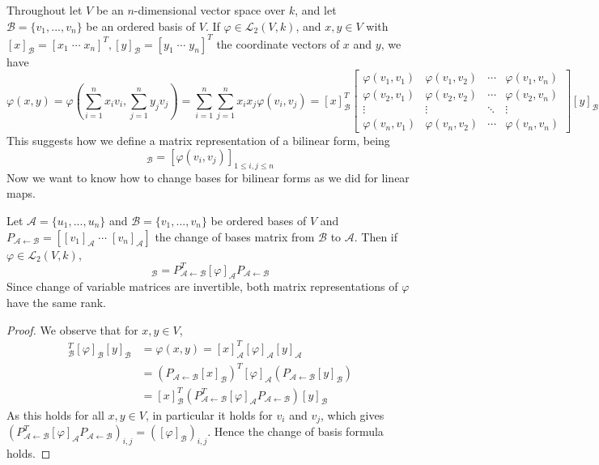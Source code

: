 Throughout let $V$ be an $n$-dimensional vector space over $k$, and let $\mathcal{B} = \{v_1,...,v_n\}$ be an ordered basis of $V$. If $\varphi \in \mathcal{L}_2(V,k)$, and $x,y \in V$ with $[x]_{\mathcal{B}} = [x_1\;\cdots \;x_n]^T,[y]_{\mathcal{B}} = [y_1\;\cdots\;y_n]^T$ the coordinate vectors of $x$ and $y$, we have \begin{equation*}
    \varphi(x,y) = \varphi\left(\sum_{i=1}^nx_iv_i,\sum_{j=1}^ny_jv_j\right) = \sum_{i=1}^n\sum_{j=1}^nx_ix_j\varphi(v_i,v_j) = [x]_{\mathcal{B}}^T\begin{bmatrix} \varphi(v_1,v_1) & \varphi(v_1,v_2)  &\cdots & \varphi(v_1,v_n) \\ \varphi(v_2,v_1) & \varphi(v_2,v_2) & \cdots & \varphi(v_2,v_n) \\ \vdots & \vdots & \ddots & \vdots \\ \varphi(v_n,v_1) & \varphi(v_n,v_2) & \cdots & \varphi(v_n,v_n)\end{bmatrix}[y]_{\mathcal{B}}
\end{equation*}
This suggests how we define a matrix representation of a bilinear form, being \begin{equation*}
    [\varphi]_{\mathcal{B}} = [\varphi(v_i,v_j)]_{1\leq i,j\leq n}
\end{equation*}
Now we want to know how to change bases for bilinear forms as we did for linear maps.

\begin{theorem}
    Let $\mathcal{A} = \{u_1,...,u_n\}$ and $\mathcal{B} = \{v_1,...,v_n\}$ be ordered bases of $V$ and $P_{\mathcal{A}\leftarrow \mathcal{B}} = \left[[v_1]_{\mathcal{A}}\;\cdots \;[v_n]_{\mathcal{A}}\right]$ the change of bases matrix from $\mathcal{B}$ to $\mathcal{A}$. Then if $\varphi \in \mathcal{L}_2(V,k)$, \begin{equation*}
        [\varphi]_{\mathcal{B}} = P_{\mathcal{A}\leftarrow \mathcal{B}}^T[\varphi]_{\mathcal{A}}P_{\mathcal{A}\leftarrow \mathcal{B}}
    \end{equation*}
    Since change of variable matrices are invertible, both matrix representations of $\varphi$ have the same rank.
\end{theorem}
\begin{proof}
    We observe that for $x,y \in V$, \begin{align*}
        [x]_{\mathcal{B}}^T[\varphi]_{\mathcal{B}}[y]_{\mathcal{B}} &= \varphi(x,y) = [x]_{\mathcal{A}}^T[\varphi]_{\mathcal{A}}[y]_{\mathcal{A}} \\
        &= (P_{\mathcal{A}\leftarrow \mathcal{B}}[x]_{\mathcal{B}})^T[\varphi]_{\mathcal{A}}(P_{\mathcal{A}\leftarrow \mathcal{B}}[y]_{\mathcal{B}}) \\
        &= [x]_{\mathcal{B}}^T(P_{\mathcal{A}\leftarrow \mathcal{B}}^T[\varphi]_{\mathcal{A}}P_{\mathcal{A}\leftarrow \mathcal{B}})[y]_{\mathcal{B}}
    \end{align*}
    As this holds for all $x,y \in V$, in particular it holds for $v_i$ and $v_j$, which gives $(P_{\mathcal{A}\leftarrow \mathcal{B}}^T[\varphi]_{\mathcal{A}}P_{\mathcal{A}\leftarrow \mathcal{B}})_{i,j} = ([\varphi]_{\mathcal{B}})_{i,j}$. Hence the change of basis formula holds.
\end{proof}

